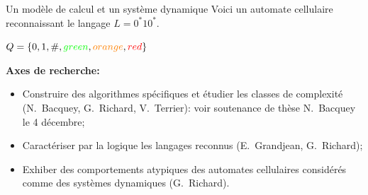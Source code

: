\documentclass[8pt]{beamer}
\begin{document}
\begin{frame}{Un modèle de calcul et un système dynamique}
Voici un automate cellulaire reconnaissant le langage $L = 0^*10^*$.

\vspace*{3mm}
\begin{minipage}[h]{0.48\linewidth}
	\begin{center}
		$Q = \{0,1,\#,{\color{green}green},{\color{orange}orange},{\color{red}red}\}$\\
		\vspace*{3mm}
		
	\end{center}
\end{minipage}
\hfill
\begin{minipage}[h]{0.48\linewidth}
	\begin{center}
		
	\end{center}
\end{minipage}

\medskip


\textbf{Axes de recherche:}
\begin{itemize}
\item Construire des algorithmes spécifiques et étudier les classes de complexité (N.~Bacquey, G.~Richard, V.~Terrier): voir soutenance de thèse N.~Bacquey le 4 décembre;
\item Caractériser par la logique les langages reconnus (E.~Grandjean, G.~Richard);
\item Exhiber des comportements \og atypiques\fg{} des automates cellulaires considérés comme des systèmes
dynamiques (G.~Richard).
\end{itemize}
\end{frame}
\end{document}
